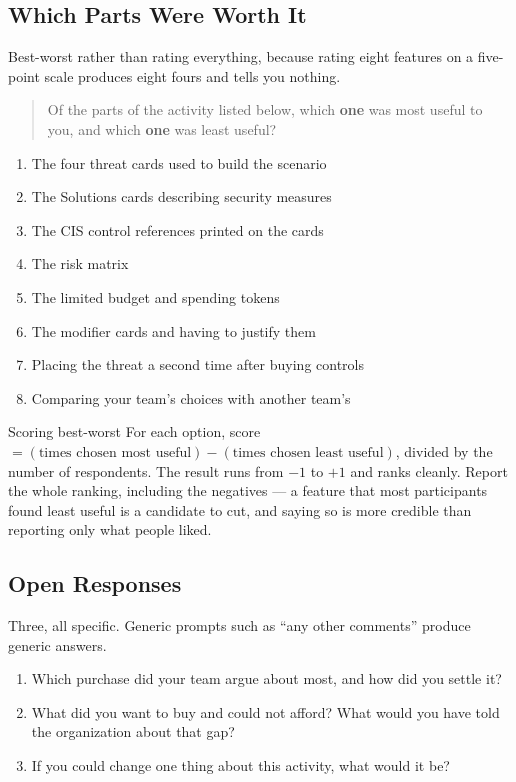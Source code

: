 \documentclass[11pt,letterpaper]{article}
\begin{document}
\subsection{Which Parts Were Worth It}

Best-worst rather than rating everything, because rating eight features on a
five-point scale produces eight fours and tells you nothing.

\begin{quote}\small
Of the parts of the activity listed below, which \textbf{one} was most useful to
you, and which \textbf{one} was least useful?
\end{quote}

\begin{enumerate}[label=(\alph*)]
\item The four threat cards used to build the scenario
\item The Solutions cards describing security measures
\item The CIS control references printed on the cards
\item The risk matrix
\item The limited budget and spending tokens
\item The modifier cards and having to justify them
\item Placing the threat a second time after buying controls
\item Comparing your team's choices with another team's
\end{enumerate}

\begin{note}{Scoring best-worst}
For each option, score $= (\text{times chosen most useful}) - (\text{times chosen
least useful})$, divided by the number of respondents. The result runs from $-1$
to $+1$ and ranks cleanly. Report the whole ranking, including the negatives ---
a feature that most participants found least useful is a candidate to cut, and
saying so is more credible than reporting only what people liked.
\end{note}

\subsection{Open Responses}

Three, all specific. Generic prompts such as ``any other comments'' produce
generic answers.

\begin{enumerate}[label=H\arabic*.,start=4]
\item Which purchase did your team argue about most, and how did you settle it?
\item What did you want to buy and could not afford? What would you have told the
organization about that gap?
\item If you could change one thing about this activity, what would it be?
\end{enumerate}
\end{document}
